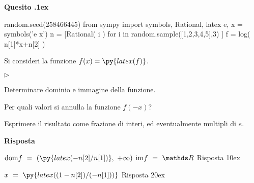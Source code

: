\documentclass[11pt,twoside,a4paper]{article}
\newcommand{\mylabel}[1]{#1\hfill}
\renewenvironment{itemize}
  {\begin{list}{$\triangleright$}{%
   \setlength{\parskip}{0mm}
   \setlength{\topsep}{.4\baselineskip}
   \setlength{\rightmargin}{0mm}
   \setlength{\listparindent}{0mm}
   \setlength{\itemindent}{0mm}
   \setlength{\labelwidth}{2ex}
   \setlength{\itemsep}{.4\baselineskip}
   \setlength{\parsep}{0mm}
   \setlength{\partopsep}{0mm}
   \setlength{\labelsep}{1ex}
   \setlength{\leftmargin}{\labelwidth+\labelsep}
   \let\makelabel\mylabel}}{%
   \end{list}\vspace*{-1.3mm}}
\newcounter{quesito}
\newenvironment{question}{\addtocounter{quesito}{1}\par\textbf{Quesito \thequesito.\kern1ex}}{\vspace{0.5\parskip}}
\newenvironment{answer}{\par\textbf{Risposta\quad}}{\vspace{\parskip}}
\begin{document}
\begin{question}
\def\RR{{\mathds R}}
\def\dom{{\rm dom}}
\def\range{{\rm im}}
\begin{pycode}
random.seed(258466445)
from sympy import symbols, Rational, latex
e, x = symbols('e x')
n = [Rational( i ) for i in random.sample([1,2,3,4,5],3) ]
f = log( n[1]*x+n[2] )
\end{pycode}
Si consideri la funzione $f(x) = \py{ latex(f) } $.
\begin{itemize}
\item[1.] Determinare dominio e immagine della funzione. 
\item[2.] Per quali valori si annulla la funzione $f(-x)$?
\end{itemize}
Esprimere il risultato come frazione di interi, ed eventualmente multipli di $e$.
\begin{answer}

{\color{blue}
$\displaystyle\dom f\ =\ \left(\py{latex(-n[2]/n[1])},\ +\infty\right)$
\qquad 
$\range f\ =\ \RR$
\hfill Risposta 1\kern0ex}

{\color{blue}
$\displaystyle x\ =\ \py{latex((1-n[2])/(-n[1]))}$
\hfill Risposta 2\kern0ex}

\end{answer}
\end{question}
\end{document}
